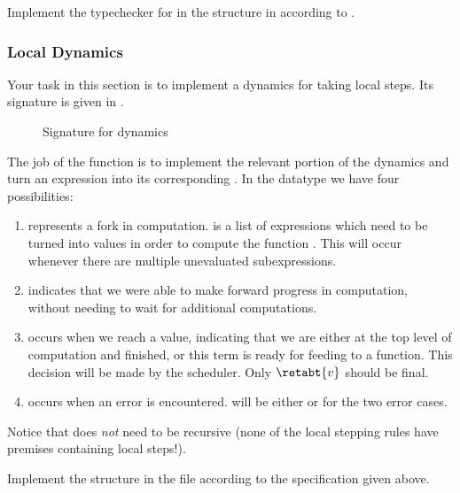 Implement the typechecker for \LangPPCFv{} in the structure  in 
according to .

\subsubsection{Local Dynamics}

Your task in this section is to implement a dynamics for taking local steps.
Its signature is given in .

\begin{figure}
  \caption{Signature  for \LangPPCFv{} dynamics}
  \label{fig:ppcf-localstepper-sig}
\end{figure}

The job of the  function is to implement the relevant portion of
the dynamics and turn an expression into its corresponding
. In the  datatype we have four possibilities:
\begin{enumerate}
  \item {} represents a fork in computation.
         is a list of expressions which need to be turned into values in
        order to compute the function . This will occur whenever
        there are multiple unevaluated subexpressions.
  \item {} indicates that we were able to make forward
        progress in computation, without needing to wait for additional
        computations.
  \item {} occurs when we reach a value,
        indicating that we are either at the top level of computation and
        finished, or this term is ready for feeding to a  function.
        This decision will be made by the scheduler.
        Only $\retabt{v}$ should be final.
  \item {} occurs when an error is encountered.  will be either
         or  for the two error cases.
\end{enumerate}

Notice that  does \emph{not} need to be recursive (none of the local stepping rules
have premises containing local steps!).

 Implement the structure  in the file
 according to the specification given above.

